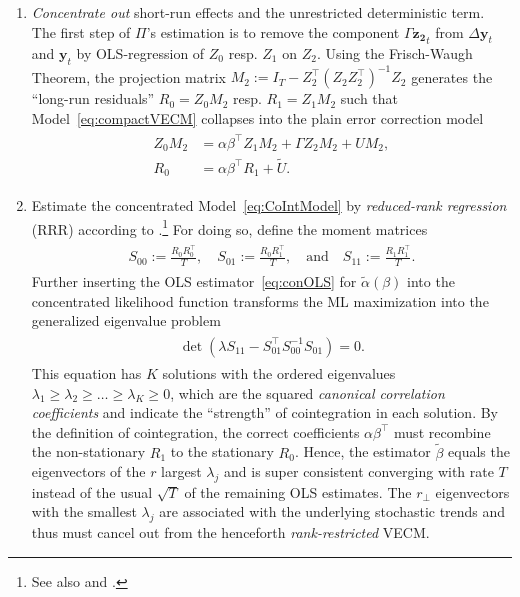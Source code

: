\begin{enumerate}[label=\textbf{\arabic*.}]
	\item \textit{Concentrate out} short-run effects and the unrestricted deterministic term. The first step of $ \Pi $'s estimation is to remove the component $ \Gamma \boldsymbol{z_2}_t $ from $ \Delta \boldsymbol{y}_t $ and $ \boldsymbol{y}_t $ by OLS-regression of $ Z_0 $ resp. $ Z_1 $ on $ Z_{2} $. Using the Frisch-Waugh Theorem, the projection matrix $ M_2 := I_T - Z_2^\top (Z^{\ }_2 Z_2^\top)^{-1} Z^{\ }_2 $ generates the ``long-run residuals'' $ R_{0} = Z_{0} M_2 $ resp. $ R_{1} = Z_{1} M_2 $ such that Model~\eqref{eq:compactVECM} collapses into the plain error correction model
	\begin{align} \label{eq:CoIntModel}
	\begin{split}
		Z_{0} M_2 & = \alpha\beta^\top Z_{1} M_2 + \Gamma Z_{2} M_2 + U M_2, \\
		R_{0} & = \alpha\beta^\top R_{1} + \widetilde{U}.
	\end{split}
	\end{align} 
	\item Estimate the concentrated Model~\eqref{eq:CoIntModel} by \textit{reduced-rank regression} (RRR) according to \citet{Anderson1951}.\footnote{See also \citet[Ch.~12.7]{Anderson2003} and \citet{Izenman1975}.} For doing so, define the moment matrices
	\begin{align} \label{eq:RRRmomat}
	\begin{split}
		S_{00} := \frac{R^{\ }_0 R_0^\top}{T}, \quad S_{01} := \frac{R^{\ }_0 R_1^\top}{T}, \quad \text{and} \quad S_{11} := \frac{R^{\ }_1 R_1^\top}{T}.
	\end{split}
	\end{align}
	Further inserting the OLS estimator~\eqref{eq:conOLS} for $ \widetilde{\alpha}(\beta) $ into the concentrated likelihood function transforms the ML maximization into the generalized eigenvalue problem
	\begin{align} \label{eq:RRReigen}
	\begin{split}
		\det \left( \lambda S_{11}^{\ } - S_{01}^\top S_{00}^{-1} S_{01}^{\ } \right) = 0.
	\end{split}
	\end{align} 
	This equation has $ K $ solutions with the ordered eigenvalues $ \lambda_1 \geq \lambda_2 \geq \ldots \geq \lambda_K \geq 0 $, which are the squared \textit{canonical correlation coefficients} and indicate the ``strength'' of cointegration in each solution. By the definition of cointegration, the correct coefficients $ \alpha\beta^\top $ must recombine the non-stationary $ R_{1} $ to the stationary $ R_{0} $. Hence, the estimator $ \widetilde{\beta} $ equals the eigenvectors of the $ r $ largest $ \lambda_j $ and is super consistent converging with rate $ T $ instead of the usual $ \sqrt{T} $ of the remaining OLS estimates. The $ r_\perp $ eigenvectors with the smallest $ \lambda_j $ are associated with the underlying stochastic trends and thus must cancel out from the henceforth \textit{rank-restricted} VECM.
	

\end{enumerate}
